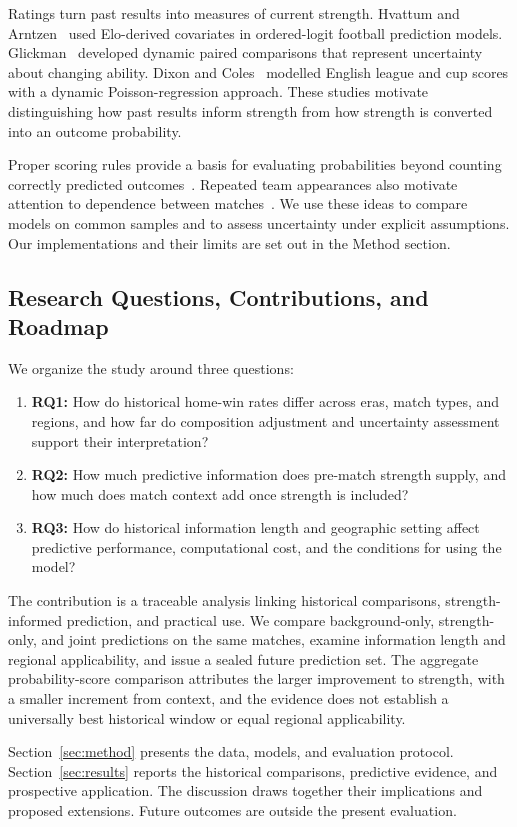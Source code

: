 Ratings turn past results into measures of current strength. Hvattum and Arntzen~\citep{hvattum2010elo} used Elo-derived covariates in ordered-logit football prediction models. Glickman~\citep{glickman1999dynamic} developed dynamic paired comparisons that represent uncertainty about changing ability. Dixon and Coles~\citep{dixon1997scores} modelled English league and cup scores with a dynamic Poisson-regression approach. These studies motivate distinguishing how past results inform strength from how strength is converted into an outcome probability.

Proper scoring rules provide a basis for evaluating probabilities beyond counting correctly predicted outcomes~\citep{gneiting2007scoring}. Repeated team appearances also motivate attention to dependence between matches~\citep{aronow2015dyadic}. We use these ideas to compare models on common samples and to assess uncertainty under explicit assumptions. Our implementations and their limits are set out in the Method section.

\subsection{Research Questions, Contributions, and Roadmap}

We organize the study around three questions:
\begin{enumerate}
\item \textbf{RQ1:} How do historical home-win rates differ across eras, match types, and regions, and how far do composition adjustment and uncertainty assessment support their interpretation?
\item \textbf{RQ2:} How much predictive information does pre-match strength supply, and how much does match context add once strength is included?
\item \textbf{RQ3:} How do historical information length and geographic setting affect predictive performance, computational cost, and the conditions for using the model?
\end{enumerate}

The contribution is a traceable analysis linking historical comparisons, strength-informed prediction, and practical use. We compare background-only, strength-only, and joint predictions on the same matches, examine information length and regional applicability, and issue a sealed future prediction set. The aggregate probability-score comparison attributes the larger improvement to strength, with a smaller increment from context, and the evidence does not establish a universally best historical window or equal regional applicability.

Section~\ref{sec:method} presents the data, models, and evaluation protocol. Section~\ref{sec:results} reports the historical comparisons, predictive evidence, and prospective application. The discussion draws together their implications and proposed extensions. Future outcomes are outside the present evaluation.
